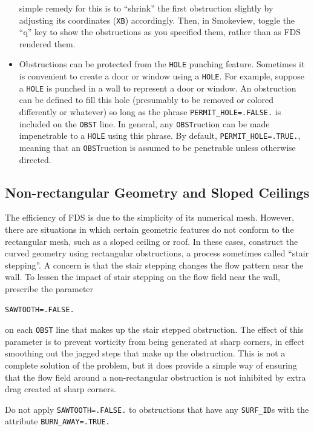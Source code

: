 \documentclass[11pt]{book}
\newcommand{\ct}{\tt\small}
\begin{document}
\begin{itemize}
simple remedy for this is to ``shrink'' the first obstruction slightly by adjusting its coordinates ({\ct XB}) accordingly. Then, in
Smokeview, toggle the ``q'' key to show the obstructions as you specified them, rather than as FDS rendered them.
\item Obstructions can be protected from the {\ct HOLE} punching feature. Sometimes
it is convenient to create a door or window using a {\ct HOLE}. For example, suppose a
{\ct HOLE} is punched in a wall to represent a door or window. An obstruction can be
defined to fill this hole (presumably to be removed or colored differently or whatever) so
long as the phrase {\ct PERMIT\_HOLE=.FALSE.} is included on the {\ct OBST} line. In general,
any {\ct OBST}ruction can be made impenetrable to a {\ct HOLE} using this phrase. By default,
{\ct PERMIT\_HOLE=.TRUE.}, meaning that an {\ct OBST}ruction is assumed to be penetrable unless
otherwise directed.
\end{itemize}

\subsection{Non-rectangular Geometry and Sloped Ceilings}%
The efficiency of FDS is due to the simplicity of its numerical mesh.
However, there are situations in which certain geometric features do
not conform to the rectangular mesh, such as a sloped ceiling or roof. In these cases,
construct the curved geometry using rectangular obstructions, a process
sometimes called ``stair stepping''. A concern is that
the stair stepping changes the flow pattern near the wall. To lessen
the impact of stair stepping on the flow field near the wall,
prescribe the parameter

\footnotesize
\begin{verbatim}
SAWTOOTH=.FALSE.
\end{verbatim}
\normalsize
on each {\ct OBST} line that makes up the stair stepped obstruction.
The effect of this parameter is to prevent vorticity from being generated
at sharp corners, in effect smoothing out the jagged steps that make up
the obstruction. This is not a complete solution of the problem, but it
does provide a simple way of ensuring that the flow field around a
non-rectangular obstruction is not inhibited by extra drag created at
sharp corners.

\begin{warning}
Do not apply {\ct SAWTOOTH=.FALSE.} to obstructions that have any {\ct SURF\_ID}s with the
attribute {\ct BURN\_AWAY=.TRUE.}
\end{warning}
\end{document}
